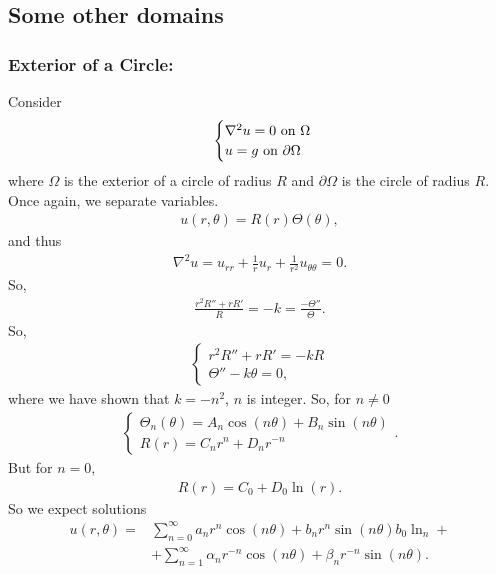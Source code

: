 \documentclass{article}
\theoremstyle{definition}
\newcommand{\p}{\partial}
\newcommand{\f}[2]{\frac{#1}{#2}}
\begin{document}
\subsection{Some other domains}

\subsubsection{Exterior of a Circle:} 
Consider
\begin{align*}
\hspace{0.5cm}\begin{cases}
\nabla^2 u = 0 \text{ on }\Omega\\
u=g \text{ on $\p\Omega$}
\end{cases}
\end{align*}
where $\Omega$ is the exterior of a circle of radius $R$ and $\p\Omega$ is the circle of radius $R$. Once again, we separate variables.
\begin{align*}
u(r,\theta) = R(r)\Theta(\theta),
\end{align*}
and thus
\begin{align*}
\nabla^2 u = u_{rr} + \f{1}{r}u_r + \f{1}{r^2}u_{\theta\theta} = 0.
\end{align*}
So,
\begin{align*}
\f{r^2R'' + rR'}{R} = -k = \f{-\Theta''}{\Theta}.
\end{align*}
So,
\begin{align*}
\begin{cases}
r^2R'' + rR' = -kR\\
\Theta'' - k\theta = 0,
\end{cases}
\end{align*}
where we have shown that $k = -n^2$, $n$ is integer. So, for $n\neq 0$
\begin{align*}
\begin{cases}
\Theta_n(\theta) = A_n\cos(n\theta) + B_n\sin(n\theta)\\
R(r) = C_nr^n + D_nr^{-n}
\end{cases}.
\end{align*}
But for $n=0$, 
\begin{align*}
R(r) = C_0+D_0\ln(r).
\end{align*}
So we expect solutions %
\begin{align*}
u(r,\theta) =& \sum^\infty_{n=0} a_n r^n \cos(n\theta) + b_n r^{n}\sin(n\theta) b_0\ln_n +\\
&+\sum^\infty_{n=1}\alpha_n r^{-n}\cos(n\theta) + \beta_n r^{-n}\sin(n\theta). 
\end{align*}
\end{document}
